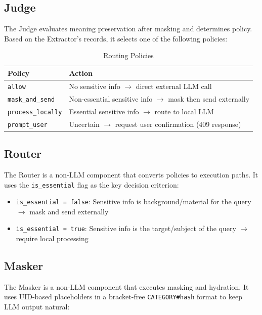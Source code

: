 \documentclass[11pt,a4paper]{article}
\begin{document}
\subsection{Judge}

The Judge evaluates meaning preservation after masking and determines policy. Based on the Extractor's records, it selects one of the following policies:

\begin{table}[h]
\centering
\begin{tabular}{@{}ll@{}}
\toprule
Policy & Action \\
\midrule
\texttt{allow} & No sensitive info $\rightarrow$ direct external LLM call \\
\texttt{mask\_and\_send} & Non-essential sensitive info $\rightarrow$ mask then send externally \\
\texttt{process\_locally} & Essential sensitive info $\rightarrow$ route to local LLM \\
\texttt{prompt\_user} & Uncertain $\rightarrow$ request user confirmation (409 response) \\
\bottomrule
\end{tabular}
\caption{Routing Policies}
\end{table}

\subsection{Router}

The Router is a non-LLM component that converts policies to execution paths. It uses the \texttt{is\_essential} flag as the key decision criterion:

\begin{itemize}[nosep]
  \item \texttt{is\_essential = false}: Sensitive info is background/material for the query $\rightarrow$ mask and send externally
  \item \texttt{is\_essential = true}: Sensitive info is the target/subject of the query $\rightarrow$ require local processing
\end{itemize}

\subsection{Masker}

The Masker is a non-LLM component that executes masking and hydration. It uses UID-based placeholders in a bracket-free \texttt{CATEGORY\#hash} format to keep LLM output natural:
\end{document}
